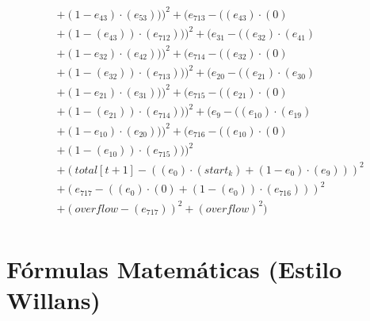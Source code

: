 \documentclass[10pt, a4paper]{article}
\begin{document}
\begin{small}
\begin{align*}
& + (1 - e_{43})  \cdot  (e_{53})))^{2} + (e_{713} - ((e_{43}) \cdot (0) \\
& + (1 - (e_{43})) \cdot (e_{712})))^{2} + (e_{31} - ((e_{32})  \cdot  (e_{41}) \\
& + (1 - e_{32})  \cdot  (e_{42})))^{2} + (e_{714} - ((e_{32}) \cdot (0) \\
& + (1 - (e_{32})) \cdot (e_{713})))^{2} + (e_{20} - ((e_{21})  \cdot  (e_{30}) \\
& + (1 - e_{21})  \cdot  (e_{31})))^{2} + (e_{715} - ((e_{21}) \cdot (0) \\
& + (1 - (e_{21})) \cdot (e_{714})))^{2} + (e_{9} - ((e_{10})  \cdot  (e_{19}) \\
& + (1 - e_{10})  \cdot  (e_{20})))^{2} + (e_{716} - ((e_{10}) \cdot (0) \\
& + (1 - (e_{10})) \cdot (e_{715})))^{2} \\
& + (total[t+1] - ((e_{0})  \cdot  (start_k) + (1 - e_{0})  \cdot  (e_{9})))^{2} \\
& + (e_{717} - ((e_{0}) \cdot (0) + (1 - (e_{0})) \cdot (e_{716})))^{2} \\
& + (overflow - (e_{717}))^{2} + (overflow)^{2}) \\
\end{align*}
\end{small}\part{Fórmulas Matemáticas (Estilo Willans)}
\end{document}
